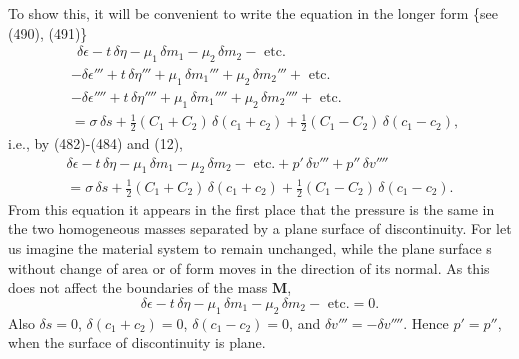 \documentclass[12pt]{article}
\newcommand{\dd}{\delta}
\begin{document}
{To show this, it will be convenient to write the equation in the
longer form \{see (490), (491)\}
\begin{align}
&\ \  \dd \epsilon - t \, \dd \eta- \mu_1 \, \dd m_1 - \mu_2 \, \dd m_2 - \text{ etc.} \nonumber \\
&- \dd \epsilon''' + t \, \dd \eta'''+ \mu_1 \, \dd m_1''' + \mu_2 \, \dd m_2''' + \text{ etc.} \nonumber \\
&- \dd \epsilon'''' + t \, \dd \eta''''+ \mu_1 \, \dd m_1'''' + \mu_2 \, \dd m_2''''+ \text{ etc.} \nonumber \\
&= \sigma \, \dd s + \tfrac{1}{2}(C_1 + C_2)\, \dd (c_1 + c_2)+ \tfrac{1}{2}(C_1 - C_2) \,\dd(c_1 - c_2),  \label{495} \end{align}
i.e., by (482)-(484) and (12),
\begin{multline}
\dd \epsilon - t \, \dd \eta- \mu_1 \, \dd m_1 - \mu_2 \, \dd m_2 - \text{ etc.} +p' \, \dd v''' +p''\, \dd v'''' \\
=  \sigma \, \dd s + \tfrac{1}{2}(C_1 + C_2)\, \dd (c_1 + c_2)+ \tfrac{1}{2}(C_1 - C_2) \,\dd(c_1 - c_2).  \label{496} \end{multline}
From this equation it appears in the first place that the pressure is the same in the two homogeneous masses separated by a plane surface of discontinuity. For let us imagine the material system to remain unchanged, while the plane surface s without change of area or of form moves in the direction of its normal. As this does not affect the boundaries of the mass $\mathbf{M}$,
$$\dd \epsilon - t \, \dd \eta- \mu_1 \, \dd m_1 - \mu_2 \, \dd m_2 - \text{ etc.} =0.$$
Also $\delta s = 0$, $\delta (c_1 + c_2) = 0$, $\delta (c_1 - c_2) = 0$, and $\delta v''' = - \delta v''''$. Hence $p' =p''$, when the surface of discontinuity is plane.


}
\end{document}
